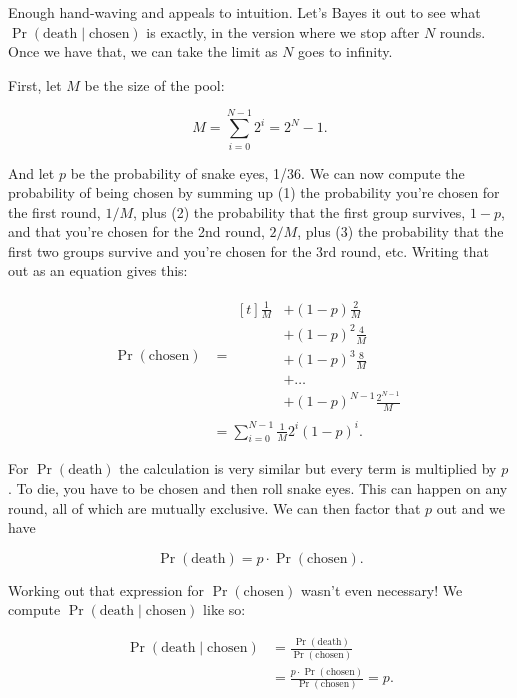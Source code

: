 \documentclass[article,twocolumn]{memoir}
\begin{document}
Enough hand-waving and appeals to intuition.
Let's Bayes it out to see what 
$\Pr(\text{death} \mid \text{chosen})$
is exactly, in the version where we stop after $N$ rounds.
Once we have that, we can take the limit as $N$ goes to infinity.

First, let $M$ be the size of the pool:

$$M = \sum_{i=0}^{N-1} 2^i = 2^N-1.$$

And let $p$ be the probability of snake eyes, 1/36.
We can now compute the probability of being chosen by summing up 
(1) the probability you're chosen for the first round, $1/M$, plus 
(2) the probability that the first group survives, $1-p$, and that you're chosen for the 2nd round, $2/M$, plus 
(3) the probability that the first two groups survive and you're chosen for the 3rd round, etc.
Writing that out as an equation gives this:

\begin{align*}
\Pr(\text{chosen}) & = 
\begin{aligned}[t]
\tfrac{1}{M} & + (1-p)      \tfrac{2}{M} \\
             & + (1-p)^2    \tfrac{4}{M} \\
             & + (1-p)^3    \tfrac{8}{M} \\
             & + \ldots                  \\
             & + (1-p)^{N-1}\frac{2^{N-1}}{M}
\end{aligned} \\
& = \sum_{i=0}^{N-1} \tfrac{1}{M} 2^i(1-p)^i.
\end{align*}

For $\Pr(\text{death})$ the calculation is very similar but every term is multiplied by $p$.
To die, you have to be chosen and then roll snake eyes.
This can happen on any round, all of which are mutually exclusive.
We can then factor that $p$ out and we have

$$
\Pr(\text{death}) = p\cdot\Pr(\text{chosen}).
$$

Working out that expression for $\Pr(\text{chosen})$ wasn't even necessary!
We compute $\Pr(\text{death} \mid \text{chosen})$ like so:

\begin{equation*}
\begin{split}
\Pr(\text{death} \mid \text{chosen}) & = 
\frac{\Pr(\text{death})}{\Pr(\text{chosen})} \\
& = \frac{p\cdot\Pr(\text{chosen})}{\Pr(\text{chosen})} = 
p.
\end{split}
\end{equation*}
\end{document}
